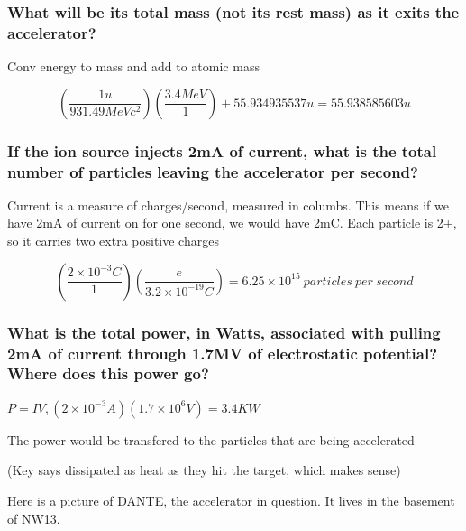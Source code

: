 \documentclass{article}
\begin{document}
\subsubsection{What will be its total mass (not its rest mass) as it exits the accelerator?}\vspace{10pt}

Conv energy to mass and add to atomic mass

$$\left(\frac{1u}{931.49MeVc^2}\right)\left(\frac{3.4MeV
}{1}\right) + 55.934935537u = 55.938585603u$$

\subsubsection{If the ion source injects 2mA of current, what is the total number of particles leaving
the accelerator per second?}

Current is a measure of charges/second, measured in columbs. This means if we have 2mA of current on for one second, we would have 2mC. Each particle is 2+, so it carries two extra positive charges\vspace{10pt}

$$\left(\frac{2\times10^{-3}C}{1}\right)\left(\frac{e}{3.2\times10^{-19}C}\right)=6.25\times10^{15} \ particles \ per \ second$$
\subsubsection{What is the total power, in Watts, associated with pulling 2mA of current through
1.7MV of electrostatic potential? Where does this power go?}\vspace{10pt}

$P=IV, (2\times10^{-3}A)(1.7\times10^6V)=3.4KW$ \vspace{10pt}

The power would be transfered to the particles that are being 
accelerated\vspace{5pt}

(Key says dissipated as heat as they hit the target, which makes sense)


Here is a picture of DANTE, the accelerator in question. It lives in the basement of NW13.
\end{document}
